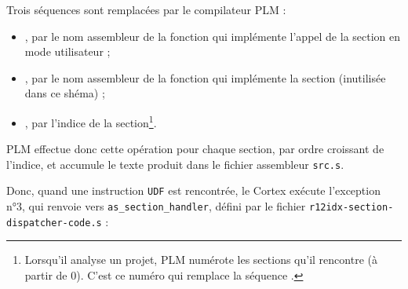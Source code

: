 Trois séquences sont remplacées par le compilateur PLM :
\begin{itemize}
\item {}, par le nom assembleur de la fonction qui implémente l'appel de la section en mode utilisateur ;
\item {}, par le nom assembleur de la fonction qui implémente la section (inutilisée dans ce shéma) ;
\item {}, par l'indice de la section\footnote{Lorsqu'il analyse un projet, PLM numérote les sections qu'il rencontre (à partir de $0$). C'est ce numéro qui remplace la séquence .}.
\end{itemize}

PLM effectue donc cette opération pour chaque section, par ordre croissant de l'indice, et accumule le texte produit dans le fichier assembleur \texttt{src.s}.

Donc, quand une instruction \texttt{UDF} est rencontrée, le Cortex exécute l'exception n°3, qui renvoie vers \texttt{as\_section\_handler}, défini par le fichier \texttt{r12idx-section-dispatcher-code.s} :

